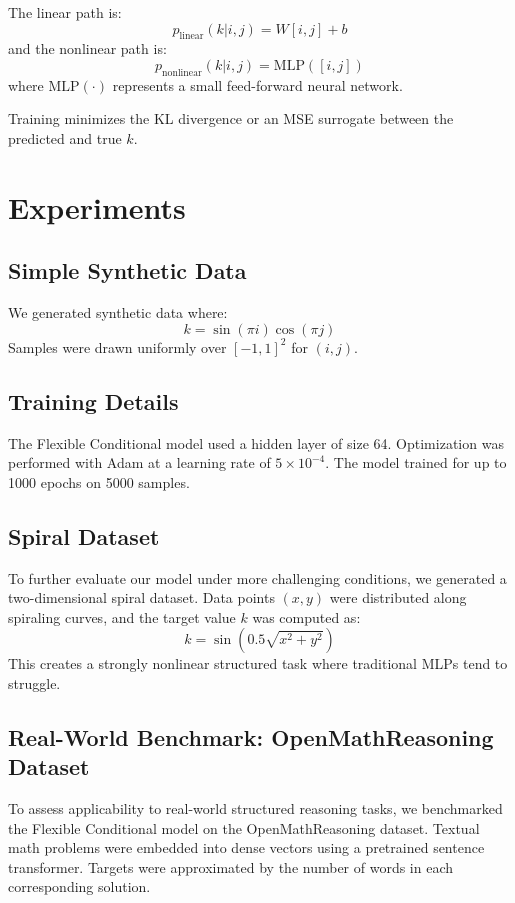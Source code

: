 \documentclass[11pt]{article}
\begin{document}
The linear path is:
\begin{equation}
    p_{\text{linear}}(k|i,j) = W[i, j] + b
\end{equation}
and the nonlinear path is:
\begin{equation}
    p_{\text{nonlinear}}(k|i,j) = \text{MLP}([i,j])
\end{equation}
where $\text{MLP}(\cdot)$ represents a small feed-forward neural network.

Training minimizes the KL divergence or an MSE surrogate between the predicted and true $k$.

\section{Experiments}
\subsection{Simple Synthetic Data}
We generated synthetic data where:
\begin{equation}
    k = \sin(\pi i) \cos(\pi j)
\end{equation}
Samples were drawn uniformly over $[-1,1]^2$ for $(i,j)$.

\subsection{Training Details}
The Flexible Conditional model used a hidden layer of size 64. Optimization was performed with Adam at a learning rate of $5 \times 10^{-4}$. The model trained for up to 1000 epochs on 5000 samples.

\subsection{Spiral Dataset}
To further evaluate our model under more challenging conditions, we generated a two-dimensional spiral dataset. Data points $(x,y)$ were distributed along spiraling curves, and the target value $k$ was computed as:
\begin{equation}
    k = \sin(0.5 \sqrt{x^2 + y^2})
\end{equation}
This creates a strongly nonlinear structured task where traditional MLPs tend to struggle.

\subsection{Real-World Benchmark: OpenMathReasoning Dataset}
To assess applicability to real-world structured reasoning tasks, we benchmarked the Flexible Conditional model on the OpenMathReasoning dataset. Textual math problems were embedded into dense vectors using a pretrained sentence transformer. Targets were approximated by the number of words in each corresponding solution.
\end{document}

